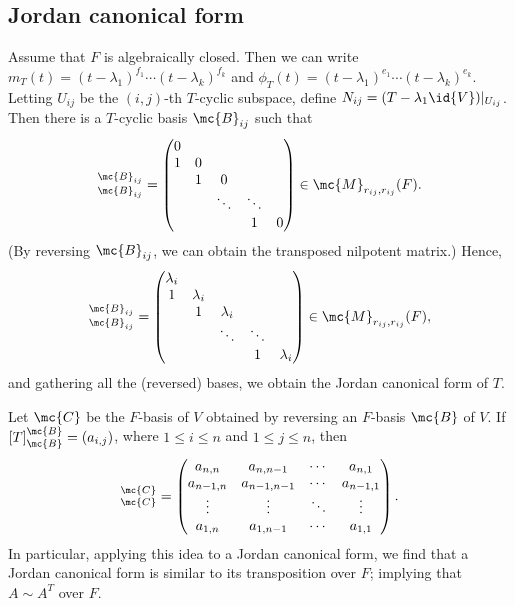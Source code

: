 \subsection{Jordan canonical form}
Assume that $F$ is algebraically closed.
Then we can write $m_T(t)=(t-\lambda_1)^{f_1}\cdots(t-\lambda_k)^{f_k}$ and $\phi_T(t)=(t-\lambda_1)^{e_1}\cdots(t-\lambda_k)^{e_k}$.
Letting $U_{i j}$ be the $(i, j)$-th $T$-cyclic subspace, define $N_{i j}=(T-\lambda_1\id{V})|_{U_{i j}}$.
Then there is a $T$-cyclic basis $\mc{B}_{i j}$ such that
\begin{align*}
    [N_{i j}]^{\mc{B}_{i j}}_{\mc{B}_{i j}}=\begin{pmatrix}
        0   &       &       &       &   \\
        1   &   0   &       &       &   \\
            &   1   &   0   &       &   \\
            &       &\ddots &\ddots &   \\
            &       &       &   1   &   0
    \end{pmatrix}\in\mc{M}_{r_{i j}, r_{i j}}(F).
\end{align*}
(By reversing $\mc{B}_{i j}$, we can obtain the transposed nilpotent matrix.)
Hence,
\begin{align*}
    [T_{U|_{i j}}]^{\mc{B}_{i j}}_{\mc{B}_{i j}}=\begin{pmatrix}
        \lambda_i   &           &           &       &   \\
            1       &\lambda_i  &           &       &   \\
                    &     1     &\lambda_i  &       &   \\
                    &           &\ddots     &\ddots &   \\
                    &           &           &   1   &\lambda_i
    \end{pmatrix}\in\mc{M}_{r_{i j}, r_{i j}}(F),
\end{align*}
and gathering all the (reversed) bases, we obtain the Jordan canonical form of $T$.

\begin{obs}
    Let $\mc{C}$ be the $F$-basis of $V$ obtained by reversing an $F$-basis $\mc{B}$ of $V$.
    If $[T]^\mc{B}_\mc{B}=(a_{i, j})$, where $1\leq i\leq n$ and $1\leq j\leq n$, then
    \begin{align*}
        [T]^\mc{C}_\mc{C}=\begin{pmatrix}
            a_{n, n}    &   a_{n, n-1}      &   \cdots  &   a_{n, 1}    \\
            a_{n-1, n}  &   a_{n-1, n-1}    &   \cdots  &   a_{n-1, 1}  \\
            \vdots      &   \vdots          &   \ddots  &   \vdots      \\
            a_{1, n}    &   a_{1, n-1}      &   \cdots  &   a_{1, 1}
        \end{pmatrix}.
    \end{align*}
    In particular, applying this idea to a Jordan canonical form, we find that a Jordan canonical form is similar to its transposition over $F$; implying that $A\sim A^T$ over $F$.
\end{obs}